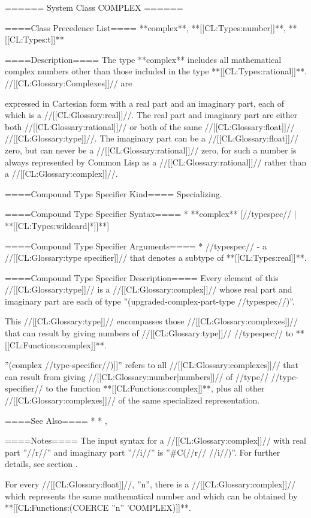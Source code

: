 ====== System Class COMPLEX ======

====Class Precedence List==== 
**complex**, **[[CL:Types:number]]**, **[[CL:Types:t]]**

====Description====
The type **complex** includes all mathematical complex numbers other than those included in the type **[[CL:Types:rational]]**. //[[CL:Glossary:Complexes]]// are

expressed in Cartesian form with a real part and an imaginary part, each of which is a //[[CL:Glossary:real]]//. The real part and imaginary part are either both //[[CL:Glossary:rational]]// or both of the same //[[CL:Glossary:float]]// //[[CL:Glossary:type]]//. The imaginary part can be a //[[CL:Glossary:float]]// zero, but can never be a //[[CL:Glossary:rational]]// zero, for such a number is always represented by Common Lisp as a //[[CL:Glossary:rational]]// rather than a //[[CL:Glossary:complex]]//.

====Compound Type Specifier Kind====
Specializing.

====Compound Type Specifier Syntax====
  * **complex** [//typespec// | **[[CL:Types:wildcard|*]]**]

====Compound Type Specifier Arguments====
  * //typespec// - a //[[CL:Glossary:type specifier]]// that denotes a subtype of **[[CL:Types:real]]**.

====Compound Type Specifier Description====
Every element of this //[[CL:Glossary:type]]// is a //[[CL:Glossary:complex]]// whose real part and imaginary part are each of type ''(upgraded-complex-part-type //typespec//)''.

This //[[CL:Glossary:type]]// encompasses those //[[CL:Glossary:complexes]]// that can result by giving numbers of //[[CL:Glossary:type]]// //typespec// to **[[CL:Functions:complex]]**.

''(complex //type-specifier//)]]'' refers to all //[[CL:Glossary:complexes]]// that can result from giving //[[CL:Glossary:number|numbers]]// of //type// //type-specifier// to the function **[[CL:Functions:complex]]**, plus all other //[[CL:Glossary:complexes]]// of the same specialized representation.

====See Also====
  * {\secref\RuleOfCanonRepForComplexRationals}
  * {\secref\NumsFromTokens}, {\secref\PrintingComplexes}

====Notes====
The input syntax for a //[[CL:Glossary:complex]]// with real part ''//r//'' and imaginary part ''//i//'' is ''#C(//r// //i//)''. For further details, see section {\secref\StandardMacroChars}.

For every //[[CL:Glossary:float]]//, ''n'', there is a //[[CL:Glossary:complex]]// which represents the same mathematical number and which can be obtained by **[[CL:Functions:(COERCE ''n'' 'COMPLEX)]]**.

 
